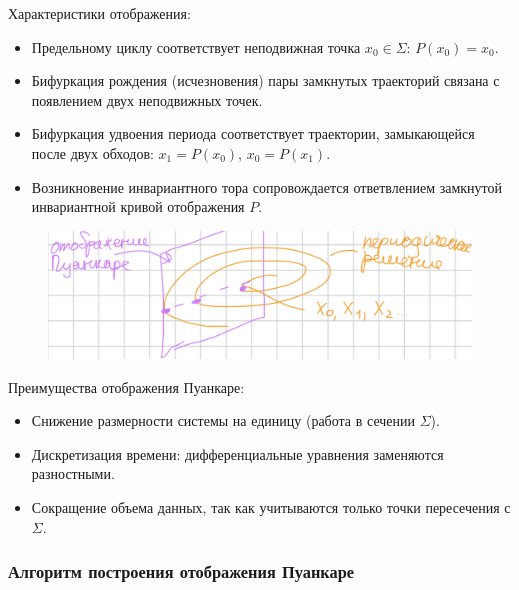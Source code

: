 	Характеристики отображения:
	\begin{itemize}
		\item Предельному циклу соответствует неподвижная точка \(x_0 \in \Sigma\): \(P(x_0) = x_0\).
		\item Бифуркация рождения (исчезновения) пары замкнутых траекторий связана с появлением двух неподвижных точек.
		\item Бифуркация удвоения периода соответствует траектории, замыкающейся после двух обходов: \(x_1 = P(x_0)\), \(x_0 = P(x_1)\).
		\item Возникновение инвариантного тора сопровождается ответвлением замкнутой инвариантной кривой отображения \(P\).
	\end{itemize}
	\vspace{-1em}
	\begin{figure}[H]
		\centering
		\includegraphics[width=1\linewidth, height=0.15\textheight]{img/14_04}
		\label{fig:14_04}
	\end{figure}
	\vspace{-2em}
	Преимущества отображения Пуанкаре:
	\begin{itemize}
		\item Снижение размерности системы на единицу (работа в сечении \(\Sigma\)).
		\item Дискретизация времени: дифференциальные уравнения заменяются разностными.
		\item Сокращение объема данных, так как учитываются только точки пересечения с \(\Sigma\).
	\end{itemize}
	
	\subsubsection{Алгоритм построения отображения Пуанкаре}
	
